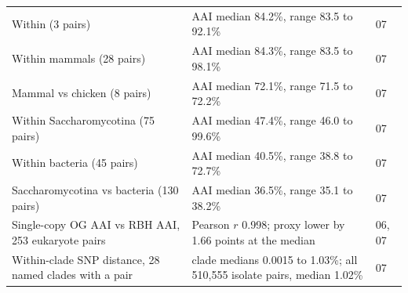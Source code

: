 \begin{table}[H]
\begin{tabular}{@{}L{78mm} L{82mm} l@{}}
Within  (3 pairs) & AAI median 84.2\%, range 83.5 to 92.1\% & 07 \\
Within mammals (28 pairs) & AAI median 84.3\%, range 83.5 to 98.1\% & 07 \\
Mammal vs chicken (8 pairs) & AAI median 72.1\%, range 71.5 to 72.2\% & 07 \\
Within Saccharomycotina (75 pairs) & AAI median 47.4\%, range 46.0 to 99.6\% & 07 \\
Within bacteria (45 pairs) & AAI median 40.5\%, range 38.8 to 72.7\% & 07 \\
Saccharomycotina vs bacteria (130 pairs) & AAI median 36.5\%, range 35.1 to 38.2\% & 07 \\
Single-copy OG AAI vs RBH AAI, 253 eukaryote pairs & Pearson $r$ 0.998; proxy lower by 1.66 points at the median & 06, 07 \\
Within-clade SNP distance, 28 named clades with a pair & clade medians 0.0015 to 1.03\%; all 510,555 isolate pairs, median 1.02\% & 07 \\
\bottomrule
\end{tabular}
\end{table}
